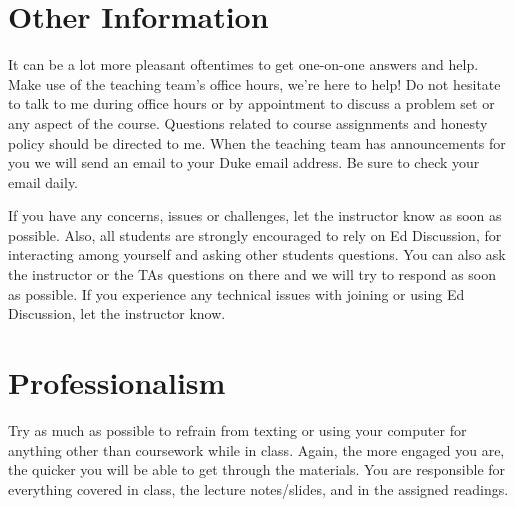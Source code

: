 \documentclass[11pt, a4paper]{article}
\begin{document}
\section{Other Information} 
It can be a lot more pleasant oftentimes to get one-on-one answers and help. Make use of the teaching team's office hours, we're here to help! Do not hesitate to talk to me during office hours or by appointment to discuss a problem set or any aspect of the course.  Questions related to course assignments and honesty policy should be directed to me. When the teaching team has announcements for you we will send an email to your Duke email address. Be sure to check your email daily.

If you have any concerns, issues or challenges, let the instructor know as soon as possible. Also, all students are strongly encouraged to rely on Ed Discussion, for interacting among yourself and asking other students questions. You can also ask the instructor or the TAs questions on there and we will try to respond as soon as possible.  If you experience any technical issues with joining or using Ed Discussion, let the instructor know.


\section{Professionalism}
Try as much as possible to refrain from texting or using your computer for anything other than coursework while in class. Again, the more engaged you are, the quicker you will be able to get through the materials. You are responsible for everything covered in class, the lecture notes/slides, and in the assigned readings.
\end{document}
